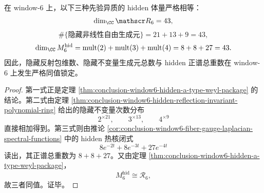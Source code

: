 \begin{theorem}\label{thm:conclusion-window6-hidden-triple-fortythree-lock}
在 window-\(6\) 上，以下三种先验异质的 hidden 体量严格相等：
\[
\dim_{\CC}\mathscr R_6=43,
\]
\[
\#\{\text{隐藏非线性自由生成元}\}=21+13+9=43,
\]
\[
\dim_{\CC}M_6^{\mathrm{hid}}
=
\operatorname{mult}(2)+\operatorname{mult}(3)+\operatorname{mult}(4)
=8+8+27=43.
\]
因此，隐藏反射包维数、隐藏不变量生成元总数与 hidden 正谱总重数在 window-\(6\) 上发生严格同值锁定。
\end{theorem}
\begin{proof}
第一式正是定理 \ref{thm:conclusion-window6-hidden-a-type-weyl-package} 的结论。第二式由定理 \ref{thm:conclusion-window6-hidden-reflection-invariant-polynomial-ring} 给出的隐藏不变量次数分布
\[
2^{\times 21},\qquad 3^{\times 13},\qquad 4^{\times 9}
\]
直接相加得到。第三式则由推论 \ref{cor:conclusion-window6-fiber-gauge-laplacian-spectral-functions} 中的 hidden 热核闭式
\[
8e^{-2t}+8e^{-3t}+27e^{-4t}
\]
读出，其正谱总重数为 \(8+8+27\)。又由定理 \ref{thm:conclusion-window6-hidden-a-type-weyl-package}，
\[
M_6^{\mathrm{hid}}\cong \mathscr R_6,
\]
故三者同值。证毕。
\end{proof}

